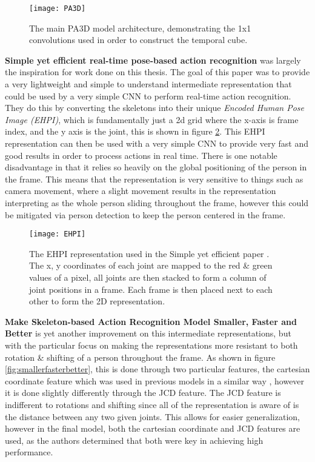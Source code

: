 \begin{figure}[ht]
	\texttt{[image: PA3D]}
	\centering
	\caption{The main PA3D \cite{PA3D} model architecture, demonstrating the 1x1 convolutions used in order to construct the temporal cube.}
	\label{fig:PA3D}
\end{figure}

\textbf{Simple yet efficient real-time pose-based action recognition} \cite{simple_yet_efficient} was largely the inspiration for work done on this thesis. The goal of this paper was to provide a very lightweight and simple to understand intermediate representation that could be used by a very simple CNN to perform real-time action recognition. They do this by converting the skeletons into their unique \textit{Encoded Human Pose Image (EHPI)}, which is fundamentally just a 2d grid where the x-axis is frame index, and the y axis is the joint, this is shown in figure \ref{fig:EHPI}. This EHPI representation can then be used with a very simple CNN to provide very fast and good results in order to process actions in real time. There is one notable disadvantage in that it relies so heavily on the global positioning of the person in the frame. This means that the representation is very sensitive to things such as camera movement, where a slight movement results in the representation interpreting as the whole person sliding throughout the frame, however this could be mitigated via person detection to keep the person centered in the frame.

\begin{figure}[ht]
	\texttt{[image: EHPI]}
	\centering
	\caption{The EHPI representation used in the Simple yet efficient paper \cite{simple_yet_efficient}. The x, y coordinates of each joint are mapped to the red \& green values of a pixel, all joints are then stacked to form a column of joint positions in a frame. Each frame is then placed next to each other to form the 2D representation.}
	\label{fig:EHPI}
\end{figure}

\textbf{Make Skeleton-based Action Recognition Model Smaller, Faster and Better} \cite{smaller_faster_better} is yet another improvement on this intermediate representations, but with the particular focus on making the representations more resistant to both rotation \& shifting of a person throughout the frame.  As shown in figure \ref{fig:smallerfasterbetter}, this is done through two particular features, the cartesian coordinate feature which was used in previous models in a similar way \cite{simple_yet_efficient}, however it is done slightly differently through the JCD feature. The JCD feature is indifferent to rotations and shifting since all of the representation is aware of is the distance between any two given joints. This allows for easier generalization, however in the final model, both the cartesian coordinate and JCD features are used, as the authors determined that both were key in achieving high performance.

